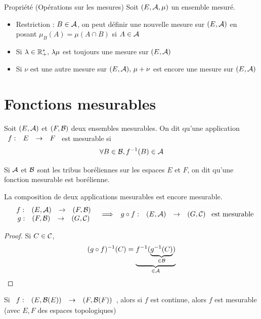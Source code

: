 \documentclass[]{report}
\begin{document}
\begin{prop}{Propriété (Opérations sur les mesures)}{}
    Soit $(E,\mathcal{A},\mu)$ un ensemble mesuré.
    \begin{itemize}
        \item Restriction : $B\in\mathcal{A}$, on peut définir une nouvelle mesure sur $(E,\mathcal{A})$ en posant $\mu_B(A)=\mu(A\cap B)$ si $A\in\mathcal{A}$
        \item Si $\lambda\in \mathbb{R}_+^*,\,\lambda\mu$ est toujours une mesure sur $(E,\mathcal{A})$
        \item Si $\nu$ est une autre mesure sur $(E,\mathcal{A}),\,\mu+\nu$ est encore une mesure sur $(E,\mathcal{A})$
    \end{itemize}
\end{prop}

\section{Fonctions mesurables}

\begin{df}{}{}
    Soit $(E,\mathcal{A})$ et $(F,\mathcal{B})$ deux ensembles mesurables. On dit qu'une application $\begin{array}{ccccc} f : & E & \to & F \end{array}$ est mesurable si $$\forall B\in\mathcal{B},f^{-1}(B)\in\mathcal{A}$$
\end{df}

\begin{ex}{}{}
    Si $\mathcal{A}$ et $\mathcal{B}$ sont les tribus boréliennes sur les espaces $E$ et $F$, on dit qu'une fonction mesurable est borélienne.
\end{ex}

\begin{prop}{}{}
    La composition de deux applications mesurables est encore mesurable.
    $$\begin{array}{cc}
    \begin{array}{ccccc} f : & (E,\mathcal{A}) & \to & (F,\mathcal{B}) \end{array} \\
    \begin{array}{ccccc} g : & (F,\mathcal{B}) & \to & (G,\mathcal{C}) \end{array}
    \end{array}\implies \begin{array}{ccccc} g\circ f : & (E,\mathcal{A}) & \to & (G,\mathcal{C}) \end{array} \text{ est mesurable}$$
\end{prop}

\begin{proof}{}{}
    Si $C\in\mathcal{C}$,$$(g\circ f)^{-1}(C)=\underbrace{f^{-1}(\underbrace{g^{-1}(C)}_{\in\mathcal{B}})}_{\in\mathcal{A}}$$
\end{proof}

\begin{prop}{}{}
    Si $\begin{array}{ccccc} f : & (E,\mathcal{B}(E)) & \to & (F,\mathcal{B}(F)) \end{array}$, alors si $f$ est continue, alors $f$ est mesurable (avec $E,F$ des espaces topologiques)
\end{prop}
\end{document}
